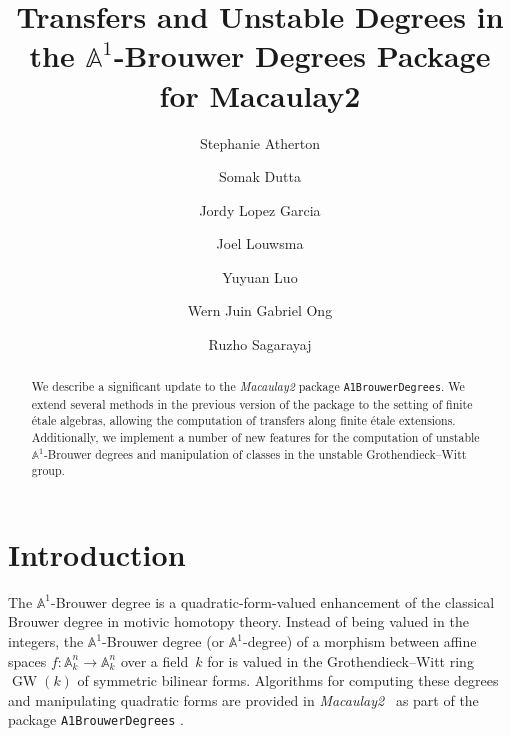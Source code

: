 \documentclass[12pt]{amsart}
\title[Transfers and Unstable $\mathbb{A}^{1}$-Brouwer Degrees in Macaulay2]{Transfers and Unstable Degrees in the $\mathbb{A}^{1}$-Brouwer Degrees Package for Macaulay2}
\author[Atherton]{Stephanie Atherton}
\author[Dutta]{Somak Dutta}
\author[Lopez Garcia]{Jordy Lopez Garcia}
\author[Louwsma]{Joel Louwsma}
\author[Luo]{Yuyuan Luo}
\author[Ong]{Wern Juin Gabriel Ong}
\author[Sagarayaj]{Ruzho Sagarayaj}
\theoremstyle{definition}
\DeclareMathOperator{\GW}{GW}
\begin{document}
\begin{abstract}
We describe a significant update to the \emph{Macaulay2} package \texttt{A1BrouwerDegrees}. We extend several methods in the previous version of the package to the setting of finite \'{e}tale algebras, allowing the computation of transfers along finite \'{e}tale extensions. Additionally, we implement a number of new features for the computation of unstable $\mathbb{A}^{1}$-Brouwer degrees and manipulation of classes in the unstable Grothendieck--Witt group. 
\end{abstract}

\maketitle

\section{Introduction}\label{sec: introduction}

The $\mathbb{A}^{1}$-Brouwer degree is a quadratic-form-valued enhancement of the classical Brouwer degree in motivic homotopy theory. Instead of being valued in the integers, the $\mathbb{A}^{1}$-Brouwer degree (or $\mathbb{A}^{1}$-degree) of a morphism between affine spaces $f\colon\mathbb{A}^{n}_{k}\to\mathbb{A}^{n}_{k}$ over a field~$k$ for is valued in the Grothendieck--Witt ring $\GW(k)$ of symmetric bilinear forms. Algorithms for computing these degrees and manipulating quadratic forms are provided in \emph{Macaulay2}~\cite{M2} as part of the package \texttt{A1BrouwerDegrees} \cite{A1BrouwerDegreesSource,A1BrouwerDegreesArticle}. 
\end{document}
